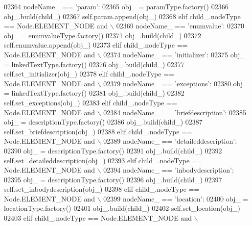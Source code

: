 \begin{DoxyCode}
{{{{{{{{{{{{{{{{{{{{{{{{{{{{{{{{{{{{{{{{{{{{{{{{{{{{{{{{{{{{{{{{{{{{{{{{{{{{{{{{{{{{{{{{{{{{{{{{{{{{{{{{{{{{{{{{{{{{{{{{{{{{{{{{{{{{{{{{{{{{{{{{{{{{{{{{{{{{{{{{{{{{{{{{{{02364             nodeName\_ == \textcolor{stringliteral}{'param'}:
02365             obj\_ = paramType.factory()
02366             obj\_.build(child\_)
02367             self.param.append(obj\_)
02368         \textcolor{keywordflow}{elif} child\_.nodeType == Node.ELEMENT\_NODE \textcolor{keywordflow}{and} \(\backslash\)
02369             nodeName\_ == \textcolor{stringliteral}{'enumvalue'}:
02370             obj\_ = enumvalueType.factory()
02371             obj\_.build(child\_)
02372             self.enumvalue.append(obj\_)
02373         \textcolor{keywordflow}{elif} child\_.nodeType == Node.ELEMENT\_NODE \textcolor{keywordflow}{and} \(\backslash\)
02374             nodeName\_ == \textcolor{stringliteral}{'initializer'}:
02375             obj\_ = linkedTextType.factory()
02376             obj\_.build(child\_)
02377             self.set_initializer(obj\_)
02378         \textcolor{keywordflow}{elif} child\_.nodeType == Node.ELEMENT\_NODE \textcolor{keywordflow}{and} \(\backslash\)
02379             nodeName\_ == \textcolor{stringliteral}{'exceptions'}:
02380             obj\_ = linkedTextType.factory()
02381             obj\_.build(child\_)
02382             self.set_exceptions(obj\_)
02383         \textcolor{keywordflow}{elif} child\_.nodeType == Node.ELEMENT\_NODE \textcolor{keywordflow}{and} \(\backslash\)
02384             nodeName\_ == \textcolor{stringliteral}{'briefdescription'}:
02385             obj\_ = descriptionType.factory()
02386             obj\_.build(child\_)
02387             self.set_briefdescription(obj\_)
02388         \textcolor{keywordflow}{elif} child\_.nodeType == Node.ELEMENT\_NODE \textcolor{keywordflow}{and} \(\backslash\)
02389             nodeName\_ == \textcolor{stringliteral}{'detaileddescription'}:
02390             obj\_ = descriptionType.factory()
02391             obj\_.build(child\_)
02392             self.set_detaileddescription(obj\_)
02393         \textcolor{keywordflow}{elif} child\_.nodeType == Node.ELEMENT\_NODE \textcolor{keywordflow}{and} \(\backslash\)
02394             nodeName\_ == \textcolor{stringliteral}{'inbodydescription'}:
02395             obj\_ = descriptionType.factory()
02396             obj\_.build(child\_)
02397             self.set_inbodydescription(obj\_)
02398         \textcolor{keywordflow}{elif} child\_.nodeType == Node.ELEMENT\_NODE \textcolor{keywordflow}{and} \(\backslash\)
02399             nodeName\_ == \textcolor{stringliteral}{'location'}:
02400             obj\_ = locationType.factory()
02401             obj\_.build(child\_)
02402             self.set_location(obj\_)
02403         \textcolor{keywordflow}{elif} child\_.nodeType == Node.ELEMENT\_NODE \textcolor{keywordflow}{and} \(\backslash\)
}}}}}}}}}}}}}}}}}}}}}}}}}}}}}}}}}}}}}}}}}}}}}}}}}}}}}}}}}}}}}}}}}}}}}}}}}}}}}}}}}}}}}}}}}}}}}}}}}}}}}}}}}}}}}}}}}}}}}}}}}}}}}}}}}}}}}}}}}}}}}}}}}}}}}}}}}}}}}}}}}}}}}}}}}}
\end{DoxyCode}
